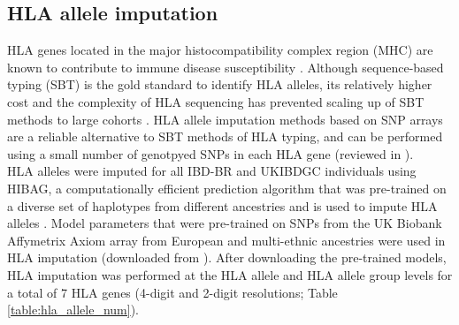 
\subsection{HLA allele imputation}
HLA genes located in the major histocompatibility complex region (MHC) are known to contribute to immune disease susceptibility \cite{Shiina2009-wt}. Although sequence-based typing (SBT) is the gold standard to identify HLA alleles, its relatively higher cost and the complexity of HLA sequencing has prevented scaling up of SBT methods to large cohorts \cite{Beksac2014-gm}. HLA allele imputation methods based on SNP arrays are a reliable alternative to SBT methods of HLA typing, and can be performed using a small number of genotpyed SNPs in each HLA gene \cite{De_Bakker2006-ho,Monsuur2008-fk,Jia2013-mh,Zheng2014-mj,Cook2021-px,Naito2021-jl} (reviewed in \cite{Naito2022-qy}). \\

HLA alleles were imputed for all IBD-BR and UKIBDGC individuals using HIBAG, a computationally efficient prediction algorithm that was pre-trained on a diverse set of haplotypes from different ancestries and is used to impute HLA alleles \cite{Zheng2014-mj}. Model parameters that were pre-trained on SNPs from the UK Biobank Affymetrix Axiom array from European and multi-ethnic ancestries were used in HLA imputation (downloaded from \cite{hibag-models-docs}). After downloading the pre-trained models, HLA imputation was performed at the HLA allele and HLA allele group levels  for a total of 7 HLA genes (4-digit and 2-digit resolutions; Table \ref{table:hla_allele_num}). 

